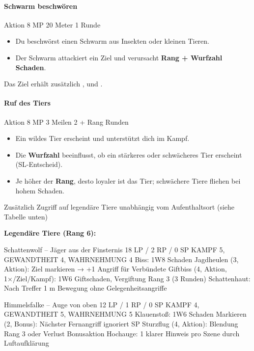 \paragraph*{Schwarm beschwören}
\spellcard
{}
{Aktion}
{8 MP}
{20 Meter}
{1 Runde}
{
	\begin{itemize}
		\item Du beschwörst einen Schwarm aus Insekten oder kleinen Tieren.
		\item Der Schwarm attackiert ein Ziel und verursacht \textbf{Rang + Wurfzahl Schaden}.
	\end{itemize}
}
{
	Das Ziel erhält zusätzlich ,  und .
}

\paragraph*{Ruf des Tiers}
\spellcard
{}
{Aktion}
{8 MP}
{3 Meilen}
{2 + Rang Runden}
{
	\begin{itemize}
		\item Ein wildes Tier erscheint und unterstützt dich im Kampf.
		\item Die \textbf{Wurfzahl} beeinflusst, ob ein stärkeres oder schwächeres Tier erscheint (SL-Entscheid).
		\item Je höher der \textbf{Rang}, desto loyaler ist das Tier; schwächere Tiere fliehen bei hohem Schaden.
	\end{itemize}
}
{
	Zusätzlich Zugriff auf legendäre Tiere unabhängig vom Aufenthaltsort (siehe Tabelle unten)
}

\textbf{Legendäre Tiere (Rang 6):}

\medskip

\creatureblock
{Schattenwolf – Jäger aus der Finsternis}
{18 LP / 2 RP / 0 SP}
{KAMPF 5, GEWANDTHEIT 4, WAHRNEHMUNG 4}
{%
	Biss: 1W8 Schaden \newline
	Jagdheulen (3, Aktion): Ziel markieren → +1 Angriff für Verbündete \newline
	Giftbiss (4, Aktion, 1×/Ziel/Kampf): 1W6 Giftschaden, Vergiftung Rang 3 (3 Runden)
}
{Schattenhaut: Nach Treffer 1 m Bewegung ohne Gelegenheitsangriffe}

\medskip

\creatureblock
{Himmelsfalke – Auge von oben}
{12 LP / 1 RP / 0 SP}
{KAMPF 4, GEWANDTHEIT 5, WAHRNEHMUNG 5}
{%
	Klauenstoß: 1W6 Schaden \newline
	Markieren (2, Bonus): Nächster Fernangriff ignoriert SP \newline
	Sturzflug (4, Aktion): Blendung Rang 3 oder Verlust Bonusaktion
}
{Hochauge: 1 klarer Hinweis pro Szene durch Luftaufklärung}

